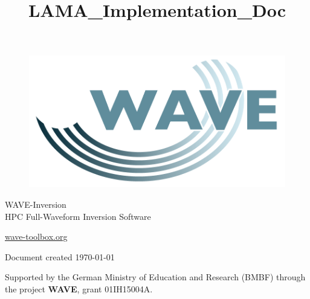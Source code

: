 \documentclass[pdftex,a4paper,parskip,listof=totoc,bibliography=totoc,onehalfspacing,12pt]{scrreprt}
\title{LAMA_Implementation_Doc}
\author{}
\begin{document}



\thispagestyle{empty} %
\begin{figure}[h] %
\begin{flushright}
\includegraphics[scale=0.15]{./images/wave_logo.png}
\end{flushright}
\end{figure}

\begin{center}
\vspace{2cm}
\huge{WAVE-Inversion}\\
\vspace{0.5cm}
\large{HPC Full-Waveform Inversion Software}
\end{center}

\vfill
\begin{center}
{\Large{\url{wave-toolbox.org}}}


{\small Document created \today}
\end{center}

\newpage 
\thispagestyle{empty}
\begin{center}
{\large
Supported by the German Ministry of Education and Research (BMBF) through the project \textbf{WAVE}, grant 01IH15004A.
}
\end{center}

\cleardoublepage

\setcounter{page}{1}
\restoregeometry


\newpage
\end{document}
